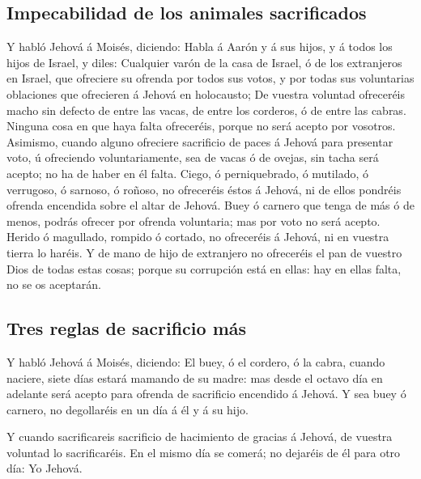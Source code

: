 \hypertarget{impecabilidad-de-los-animales-sacrificados}{%
\subsection{Impecabilidad de los animales
sacrificados}\label{impecabilidad-de-los-animales-sacrificados}}

 Y habló Jehová á Moisés, diciendo:  Habla á
Aarón y á sus hijos, y á todos los hijos de Israel, y diles: Cualquier
varón de la casa de Israel, ó de los extranjeros en Israel, que
ofreciere su ofrenda por todos sus votos, y por todas sus voluntarias
oblaciones que ofrecieren á Jehová en holocausto;  De
vuestra voluntad ofreceréis macho sin defecto de entre las vacas, de
entre los corderos, ó de entre las cabras.  Ninguna cosa en
que haya falta ofreceréis, porque no será acepto por vosotros.
 Asimismo, cuando alguno ofreciere sacrificio de paces á
Jehová para presentar voto, ú ofreciendo voluntariamente, sea de vacas ó
de ovejas, sin tacha será acepto; no ha de haber en él falta.
 Ciego, ó perniquebrado, ó mutilado, ó verrugoso, ó
sarnoso, ó roñoso, no ofreceréis éstos á Jehová, ni de ellos pondréis
ofrenda encendida sobre el altar de Jehová.  Buey ó carnero
que tenga de más ó de menos, podrás ofrecer por ofrenda voluntaria; mas
por voto no será acepto.  Herido ó magullado, rompido ó
cortado, no ofreceréis á Jehová, ni en vuestra tierra lo haréis.
 Y de mano de hijo de extranjero no ofreceréis el pan de
vuestro Dios de todas estas cosas; porque su corrupción está en ellas:
hay en ellas falta, no se os aceptarán.

\hypertarget{tres-reglas-de-sacrificio-muxe1s}{%
\subsection{Tres reglas de sacrificio
más}\label{tres-reglas-de-sacrificio-muxe1s}}

 Y habló Jehová á Moisés, diciendo:  El buey,
ó el cordero, ó la cabra, cuando naciere, siete días estará mamando de
su madre: mas desde el octavo día en adelante será acepto para ofrenda
de sacrificio encendido á Jehová.  Y sea buey ó carnero, no
degollaréis en un día á él y á su hijo.

 Y cuando sacrificareis sacrificio de hacimiento de gracias
á Jehová, de vuestra voluntad lo sacrificaréis.  En el
mismo día se comerá; no dejaréis de él para otro día: Yo Jehová.

